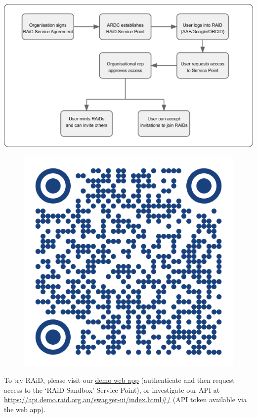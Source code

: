 \documentclass[a0,portrait]{a0poster}
\newenvironment{Figure}
  {\par\medskip\noindent\minipage{\linewidth}}
  {\endminipage\par\medskip}
\begin{document}
\begin{multicols}{3}
\begin{Figure}
  \centering
  \includegraphics[width=0.9\linewidth]{figures/raid-workflow.png}
  \label{raid-workflow}
\end{Figure}

\vspace{1cm}

\setlength{\intextsep}{0pt}  %
\setlength{\columnsep}{10pt}  %

\begin{figure}
\includegraphics[width=0.08\columnwidth]{figures/QR-code.png}
\end{figure}

\large{To try RAiD, please visit our \href{https://app.demo.raid.org.au/}{demo web app} (authenticate and then request access to the ‘RAiD Sandbox’ Service Point), or investigate our API at \href{https://api.demo.raid.org.au/swagger-ui/index.html\#/}{https://api.demo.raid.org.au/swagger-ui/index.html\#/} (API token available via the web app).
}

\vspace{-1cm}


\end{multicols}
\end{document}
